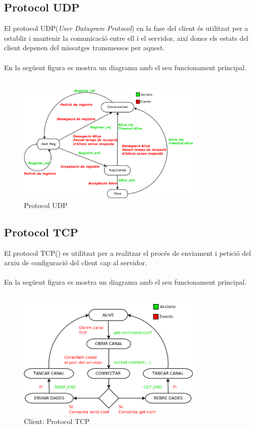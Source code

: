 \documentclass[11pt]{article}
\begin{document}
\subsection{Protocol UDP}	
El protocol UDP(\textit{User Datagram Protocol}) en la fase del client és utilitzat per a establir i mantenir la comunicació entre ell i el servidor, així doncs els estats del client depenen del missatges transmessos per aquest.\\\\
En la següent figura es mostra un diagrama amb el seu funcionament principal.
\\\\
\begin{figure}[h]
    \centering
    \includegraphics[width=0.8\textwidth]{UDP_diagram.png}
    \caption{Protocol UDP}
    \label{fig:ProtcolUDP}
\end{figure}
\newpage
\subsection{Protocol TCP}
El protocol TCP(\textit{}) es utilitzat per a realitzar el procés de enviament i petició del arxiu de configuració del client cap al servidor.
\\\\
En la següent figura es mostra un diagrama amb el seu funcionament principal.
\\\\
\begin{figure}[h]
    \centering
    \includegraphics[width=0.8\textwidth]{clientTCP.png}
    \caption{Client: Protocol TCP}
    \label{fig:PrtocolTCP}
\end{figure}
\newpage
\justify
\end{document}
